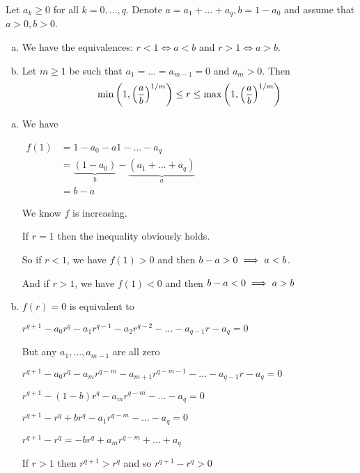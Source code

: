 \begin{theorem}\label{thm:rineq}
Let $a_k \geq 0$ for all $k = 0, \dots , q$. Denote $a = a_1 + \dots + a_q, b = 1 - a_0$
and assume that $a > 0, b > 0$.
\begin{enumerate}[(a)]
    \item We have the equivalences: $r < 1 \iff a < b$ and $r > 1 \iff a > b$.
    \item Let $m \geq 1$ be such that $a_1 = \dots = a_{m-1} = 0$ and $a_m > 0$. Then
    \begin{equation} \label{eq:maxminr}
        \min\left(1,\left(\frac{a}{b}\right)^{1/m}\right)\leq r \leq \max\left(1,\left(\frac{a}{b}\right)^{1/m}\right)
    \end{equation}
\end{enumerate}
\begin{pf}
\begin{enumerate}[(a)]
    \item We have 
    
    $\begin{aligned}
    f(1) &= 1 - a_0 - a1 - \dots - a_q \\
           &= \underbrace{(1-a_0)}_{b}-\underbrace{(a_1+\dots+a_q)}_{a}\\
           &= b - a
    \end{aligned}$
    
    We know $f$ is increasing.
    
     If $r=1$ then the inequality obviously holds.
    
    So if $r<1$, we have $f(1)>0$ and then $b - a>0 \implies a<b$.
    
    And if $r>1$, we have $f(1)<0$ and then $b - a<0 \implies a>b$
    
    \item $f(r)=0$ is equivalent to 
    
    $r^{q+1} - a_0r^q - a_1r^{q-1} - a_2r^{q-2} - \dots - a_{q-1}r - a_q=0$
    
    But any $a_1,\dots,a_{m-1}$ are all zero
    
    \imp $r^{q+1} - a_0r^q - a_mr^{q-m} - a_{m+1}r^{q-m-1} - \dots - a_{q-1}r - a_q=0$ 
     
    \imp $r^{q+1} - (1-b)r^q - a_mr^{q-m} - \dots -  a_q=0$
    
    \imp $r^{q+1} - r^q + br^q - a_1r^{q-m} - \dots -  a_q=0$
    
    \imp $r^{q+1} - r^q =-br^q + a_mr^{q-m} + \dots  + a_q$
    
    If $r>1$ then $r^{q+1}>r^q$ and so $r^{q+1}-r^q>0$
    

\end{enumerate}
\end{pf}
\end{theorem}
